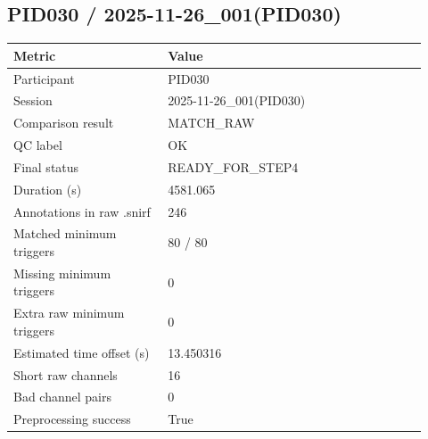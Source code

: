\subsection*{PID030 / 2025-11-26\_001(PID030)}
\begin{tabular}{p{0.34\linewidth}p{0.58\linewidth}}
\toprule
Metric & Value\\
\midrule
Participant & PID030\\
Session & 2025-11-26\_001(PID030)\\
Comparison result & MATCH\_RAW\\
QC label & OK\\
Final status & READY\_FOR\_STEP4\\
Duration (s) & 4581.065\\
Annotations in raw .snirf & 246\\
Matched minimum triggers & 80 / 80\\
Missing minimum triggers & 0\\
Extra raw minimum triggers & 0\\
Estimated time offset (s) & 13.450316\\
Short raw channels & 16\\
Bad channel pairs & 0\\
Preprocessing success & True\\
\bottomrule
\end{tabular}
